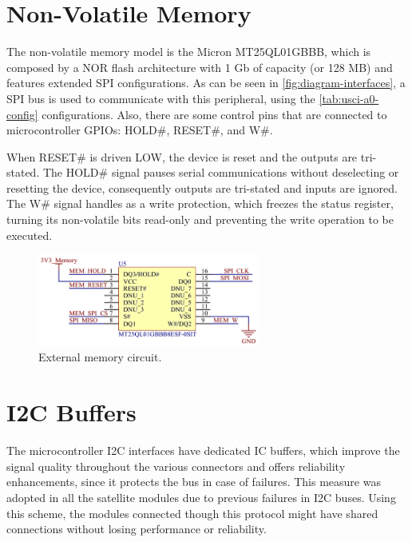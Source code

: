 \section{Non-Volatile Memory}

The non-volatile memory model is the Micron MT25QL01GBBB, which is composed by a NOR flash architecture with 1 Gb of capacity (or 128 MB) and features extended SPI configurations. As can be seen in \autoref{fig:diagram-interfaces}, a SPI bus is used to communicate with this peripheral, using the \autoref{tab:usci-a0-config} configurations. Also, there are some control pins that are connected to microcontroller GPIOs: HOLD\#, RESET\#, and W\#. 

When RESET\# is driven LOW, the device is reset and the outputs are tri-stated. The HOLD\# signal pauses serial communications without deselecting or resetting the device, consequently outputs are tri-stated and inputs are ignored. The W\# signal handles as a write protection, which freezes the status register, turning its non-volatile bits read-only and preventing the write operation to be executed.


\begin{figure}[!ht]
    \begin{center}
        \includegraphics[width=0.65\textwidth]{figures/ext-memory-circuit.png}
        \caption{External memory circuit.}
        \label{fig:ext-mem-circuit}
    \end{center}
\end{figure}

\section{I2C Buffers}

The microcontroller I2C interfaces have dedicated IC buffers, which improve the signal quality throughout the various connectors and offers reliability enhancements, since it protects the bus in case of failures. This measure was adopted in all the satellite modules due to previous failures in I2C buses. Using this scheme, the modules connected though this protocol might have shared connections without losing performance or reliability. 

